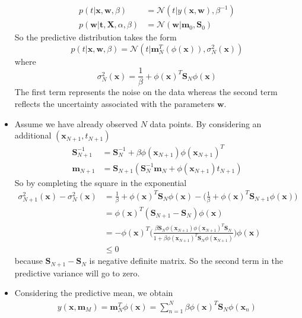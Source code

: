 \documentclass[12pt, a4paper]{article}
\begin{document}
\begin{itemize}
\begin{align*}
            p(t|\bm{x},\bm{w},\beta)&=\mathcal{N}(t|y(\bm{x},\bm{w}),\beta^{-1})\\
            p(\bm{w}|\bm{t},\bm{X},\alpha,\beta)&=\mathcal{N}(\bm{w}|\bm{m}_0,\bm{S}_0)
        \end{align*}
        So the predictive distribution takes the form
        \begin{equation*}
            p(t|\bm{x},\bm{w},\beta)=\mathcal{N}(t|\bm{m}_N^T(\phi(\bm{x})),\sigma_N^2(\bm{x}))
        \end{equation*}
        where
        \begin{equation*}
            \sigma_N^2(\bm{x})=\frac{1}{\beta}+\phi(\bm{x})^T\bm{S}_N\phi(\bm{x})
        \end{equation*}
        The first term represents the noise on the data whereas the second term reflects the uncertainty
        associated with the parameters $\bm{w}$.
        \item Assume we have already observed $N$ data points. By considering an additional 
        $(\bm{x}_{N+1},t_{N+1})$
        \begin{align*}
            \bm{S}_{N+1}^{-1}&=\bm{S}_N^{-1}+\beta\phi(\bm{x}_{N+1})\phi(\bm{x}_{N+1})^T\\
            \bm{m}_{N+1}&=\bm{S}_{N+1}(\bm{S}_N^{-1}\bm{m}_N+\phi(\bm{x}_{N+1})t_{N+1})
        \end{align*}
        So by completing the square in the exponential
        \begin{align*}
            \sigma_{N+1}^2(\bm{x})-\sigma_N^2(\bm{x})&=\frac{1}{\beta}+\phi(\bm{x})^T\bm{S}_N\phi(\bm{x})
            -\Big(\frac{1}{\beta}+\phi(\bm{x})^T\bm{S}_{N+1}\phi(\bm{x})\Big)\\
            &=\phi(\bm{x})^T(\bm{S}_{N+1}-\bm{S}_N)\phi(\bm{x})\\
            &=-\phi(\bm{x})^T\Big(\frac{\beta\bm{S}_N\phi(\bm{x}_{N+1})\phi(\bm{x}_{N+1})^T\bm{S}_N}
            {1+\beta\phi(\bm{x}_{N+1})^T\bm{S}_N\phi(\bm{x}_{N+1})}\Big)\phi(\bm{x})\\
            &\le 0
        \end{align*}
        because $\bm{S}_{N+1}-\bm{S}_{N}$ is negative definite matrix. So the second term in the predictive
        variance will go to zero.
        \item Considering the predictive mean, we obtain
        \begin{eqnarray}
            y(\bm{x},\bm{m}_M)=\bm{m}_N^T\phi(\bm{x})=\sum_{n=1}^N\beta\phi(\bm{x})^T\bm{S}_N\phi(\bm{x}_n)

\end{eqnarray}
\end{itemize}
\end{document}
